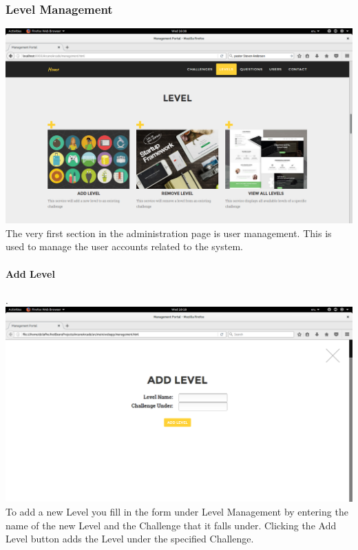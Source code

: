 \documentclass[english]{article}
\begin{document}
				
				
				
			\subsubsection{Level Management}
				\includegraphics[width=\linewidth]{Level.png}				\newline
				The very first section in the administration page is user management. This is used to manage the user accounts related to the system.
				\\[12pt]\newline
				
				\paragraph{Add Level}. \\ \newline
				\includegraphics[width=\linewidth]{AddLevel.png}				\newline
To add a new Level you fill in the form under Level Management by entering the name of the new Level and the Challenge that it falls under. Clicking the Add Level button adds the Level under the specified Challenge.
				\\[12pt]\newline
\end{document}
